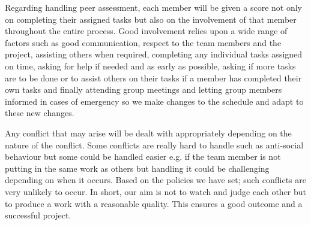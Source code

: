 \documentclass{article}
\begin{document}
\begin{flushleft}
Regarding handling peer assessment, each member will be given a score not only on completing their assigned tasks but also on the involvement of that member throughout the entire process. Good involvement relies upon a wide range of factors such as good communication, respect to the team members and the project, assisting others when required, completing any individual tasks assigned on time, asking for help if needed and as early as possible, asking if more tasks are to be done or to assist others on their tasks if a member has completed their own tasks and finally attending group meetings and letting group members informed in cases of emergency so we make changes to the schedule and adapt to these new changes. 
\end{flushleft}

\begin{flushleft}
Any conflict that may arise will be dealt with appropriately depending on the nature of the conflict. Some conflicts are really hard to handle such as anti-social behaviour but some could be handled easier e.g. if the team member is not putting in the same work as others but handling it could be challenging depending on when it occurs. Based on the policies we have set; such conflicts are very unlikely to occur. In short, our aim is not to watch and judge each other but to produce a work with a reasonable quality. This ensures a good outcome and a successful project. 
\end{flushleft}
\end{document}
